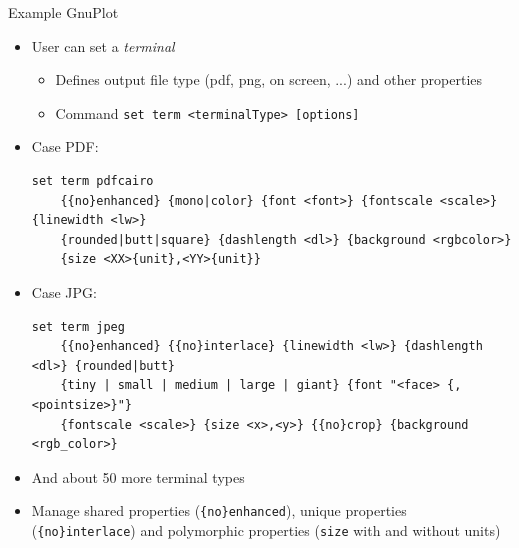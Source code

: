 
\begin{frame}[fragile]{Example GnuPlot}
%
\begin{itemize}
\item User can set a \emph{terminal}
	\begin{itemize}
	\item Defines output file type (pdf, png, on screen, ...) and other properties
	\item Command \texttt{set term <terminalType> [options]}
	\end{itemize}
	\pause
\item Case PDF:
	\begin{verbatim}
set term pdfcairo
    {{no}enhanced} {mono|color} {font <font>} {fontscale <scale>} {linewidth <lw>} 
    {rounded|butt|square} {dashlength <dl>} {background <rgbcolor>} 
    {size <XX>{unit},<YY>{unit}}
	\end{verbatim}
	\pause
\item Case JPG:
	\begin{verbatim}
set term jpeg
    {{no}enhanced} {{no}interlace} {linewidth <lw>} {dashlength <dl>} {rounded|butt}
    {tiny | small | medium | large | giant} {font "<face> {,<pointsize>}"} 
    {fontscale <scale>} {size <x>,<y>} {{no}crop} {background <rgb_color>}
	\end{verbatim}
	\pause
\item And about 50 more terminal types
	\pause
\item[\Thus] Manage shared properties (\texttt{\{no\}enhanced}), unique properties (\texttt{\{no\}interlace}) and polymorphic properties (\texttt{size} with and without units)
\end{itemize}
%
\end{frame}


